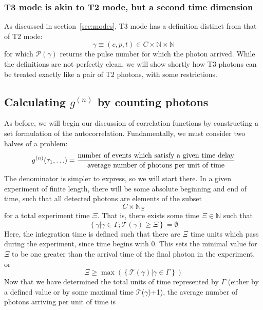 \documentclass{article}
\newcommand{\braces}[1]{\ensuremath{\left\lbrace #1 \right\rbrace}}
\newcommand{\gn}[1]{\ensuremath{g^{(#1)}}}
\newcommand{\wholes}{\ensuremath{\mathbb{N}}}
\newcommand{\channels}{\ensuremath{C}}
\newcommand{\Time}{\ensuremath{\mathcal{T}}}
\newcommand{\photon}{\ensuremath{\gamma}}
\newcommand{\photons}{\ensuremath{\Gamma}}
\newcommand{\Pulse}{\ensuremath{\mathcal{P}}}
\newcommand{\integrationtime}{\ensuremath{\Xi}}
\begin{document}
\subsubsection{T3 mode is akin to T2 mode, but a second time dimension}
As discussed in section~\ref{sec:modes}, T3 mode has a definition distinct from that of T2 mode:
\begin{equation}
\photon\equiv(c,p,t)\in C\times\wholes\times\wholes
\end{equation}
for which $\Pulse(\photon)$ returns the pulse number for which the photon arrived. While the definitions are not perfectly clean, we will show shortly how T3 photons can be treated exactly like a pair of T2 photons, with some restrictions.

\subsection{Calculating \gn{n} by counting photons}
As before, we will begin our discussion of correlation functions by constructing a set formulation of the autocorrelation. Fundamentally, we must consider two halves of a problem:
\begin{equation}
\gn{n}(\tau_{1},\ldots)=\frac{\textnormal{number of events which satisfy a given time delay}}
     {\textnormal{average number of photons per unit of time}}
\end{equation}
The denominator is simpler to express, so we will start there. In a given experiment of finite length, there will be some absolute beginning and end of time, such that all detected photons are elements of the subset
\begin{equation}
\channels\times \wholes_{\integrationtime}
\end{equation}
for a total experiment time \integrationtime. That is, there exists some time $\integrationtime\in\wholes$ such that
\begin{equation}
\braces{\photon\left|\photon\in\photons;\Time(\photon)\ge\integrationtime\right.} = \emptyset
\end{equation}
Here, the integration time is defined such that there are \integrationtime{} time units which pass during the experiment, since time begins with 0. This sets the minimal value for \integrationtime{} to be one greater than the arrival time of the final photon in the experiment, or
\begin{equation}
\integrationtime\ge\max(\braces{\Time(\photon)|\photon\in\photons})
\end{equation}
Now that we have determined the total units of time represented by \photons{} (either by a defined value or by some maximal time \Time(\photon)+1), the average number of photons arriving per unit of time is
\end{document}
